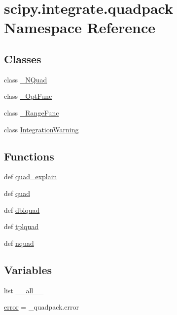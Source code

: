 \hypertarget{namespacescipy_1_1integrate_1_1quadpack}{}\section{scipy.\+integrate.\+quadpack Namespace Reference}
\label{namespacescipy_1_1integrate_1_1quadpack}
\subsection*{Classes}
\begin{DoxyCompactItemize}
\item 
class \hyperlink{classscipy_1_1integrate_1_1quadpack_1_1__NQuad}{\+\_\+\+N\+Quad}
\item 
class \hyperlink{classscipy_1_1integrate_1_1quadpack_1_1__OptFunc}{\+\_\+\+Opt\+Func}
\item 
class \hyperlink{classscipy_1_1integrate_1_1quadpack_1_1__RangeFunc}{\+\_\+\+Range\+Func}
\item 
class \hyperlink{classscipy_1_1integrate_1_1quadpack_1_1IntegrationWarning}{Integration\+Warning}
\end{DoxyCompactItemize}
\subsection*{Functions}
\begin{DoxyCompactItemize}
\item 
def \hyperlink{namespacescipy_1_1integrate_1_1quadpack_aecbfaf132d0ef23a4cc6b89eedc56bce}{quad\+\_\+explain}
\item 
def \hyperlink{namespacescipy_1_1integrate_1_1quadpack_aeccf54fc8094c3b72b7bd25ba83c12fb}{quad}
\item 
def \hyperlink{namespacescipy_1_1integrate_1_1quadpack_ad39f78042b65cb8628cb5eb61315f51c}{dblquad}
\item 
def \hyperlink{namespacescipy_1_1integrate_1_1quadpack_af08f55269e5ba0704cb0d9d48bf6bc11}{tplquad}
\item 
def \hyperlink{namespacescipy_1_1integrate_1_1quadpack_a9d74edd29f4ad4fad4b9b64bc00aad91}{nquad}
\end{DoxyCompactItemize}
\subsection*{Variables}
\begin{DoxyCompactItemize}
\item 
list \hyperlink{namespacescipy_1_1integrate_1_1quadpack_a4af6ab2f0ad1ccff86bcc4e4bbd5066e}{\+\_\+\+\_\+all\+\_\+\+\_\+}
\item 
\hyperlink{namespacescipy_1_1integrate_1_1quadpack_a8ebc8a6d8ca779f95551f445cd6f5b0e}{error} = \+\_\+quadpack.\+error
\end{DoxyCompactItemize}


